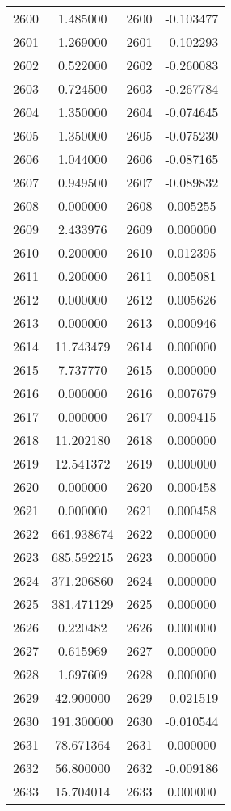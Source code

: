 \documentclass[12pt]{article}
\begin{document}
\begin{longtable}{@{}cccc@{}}
2600 & 1.485000 & 2600 & -0.103477 \\
2601 & 1.269000 & 2601 & -0.102293 \\
2602 & 0.522000 & 2602 & -0.260083 \\
2603 & 0.724500 & 2603 & -0.267784 \\
2604 & 1.350000 & 2604 & -0.074645 \\
2605 & 1.350000 & 2605 & -0.075230 \\
2606 & 1.044000 & 2606 & -0.087165 \\
2607 & 0.949500 & 2607 & -0.089832 \\
2608 & 0.000000 & 2608 & 0.005255 \\
2609 & 2.433976 & 2609 & 0.000000 \\
2610 & 0.200000 & 2610 & 0.012395 \\
2611 & 0.200000 & 2611 & 0.005081 \\
2612 & 0.000000 & 2612 & 0.005626 \\
2613 & 0.000000 & 2613 & 0.000946 \\
2614 & 11.743479 & 2614 & 0.000000 \\
2615 & 7.737770 & 2615 & 0.000000 \\
2616 & 0.000000 & 2616 & 0.007679 \\
2617 & 0.000000 & 2617 & 0.009415 \\
2618 & 11.202180 & 2618 & 0.000000 \\
2619 & 12.541372 & 2619 & 0.000000 \\
2620 & 0.000000 & 2620 & 0.000458 \\
2621 & 0.000000 & 2621 & 0.000458 \\
2622 & 661.938674 & 2622 & 0.000000 \\
2623 & 685.592215 & 2623 & 0.000000 \\
2624 & 371.206860 & 2624 & 0.000000 \\
2625 & 381.471129 & 2625 & 0.000000 \\
2626 & 0.220482 & 2626 & 0.000000 \\
2627 & 0.615969 & 2627 & 0.000000 \\
2628 & 1.697609 & 2628 & 0.000000 \\
2629 & 42.900000 & 2629 & -0.021519 \\
2630 & 191.300000 & 2630 & -0.010544 \\
2631 & 78.671364 & 2631 & 0.000000 \\
2632 & 56.800000 & 2632 & -0.009186 \\
2633 & 15.704014 & 2633 & 0.000000 \\

\end{longtable}
\end{document}
